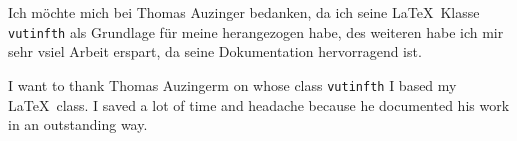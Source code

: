 \documentclass[../thesis.tex]{subfiles} %
\begin{document}
\begin{danksagung*}
Ich möchte mich bei Thomas Auzinger bedanken, da ich seine \LaTeX\ Klasse \verb|vutinfth| als Grundlage für meine herangezogen habe, des weiteren habe ich mir sehr vsiel Arbeit erspart, da seine Dokumentation hervorragend ist.
\end{danksagung*}

\begin{acknowledgements*}
I want to thank Thomas Auzingerm on whose class \verb|vutinfth| I based my \LaTeX\ class. I saved a lot of time and headache because he documented his work in an outstanding way. 
\end{acknowledgements*}
\end{document}
